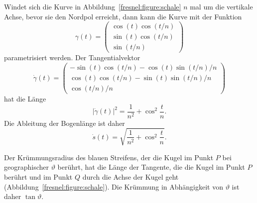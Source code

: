 Windet sich die Kurve in Abbildung~\ref{fresnel:figure:schale} $n$
mal um die vertikale Achse, bevor sie den Nordpol erreicht, dann kann
die Kurve mit der Funktion
\[
\gamma(t)
=
\begin{pmatrix}
\cos(t) \cos(t/n) \\
\sin(t) \cos(t/n) \\
\sin(t/n)
\end{pmatrix}
\]
parametrisiert werden.
Der Tangentialvektor
\[
\dot{\gamma}(t)
=
\begin{pmatrix}
-\sin(t)\cos(t/n) - \cos(t)\sin(t/n)/n \\
\cos(t)\cos(t/n) - \sin(t)\sin(t/n)/n \\
\cos(t/n)/n
\end{pmatrix}
\]
hat die Länge
\[
| \dot{\gamma}(t) |^2
=
\frac{1}{n^2}
+
\cos^2\frac{t}{n}.
\]
Die Ableitung der Bogenlänge ist daher
\[
\dot{s}(t)
=
\sqrt{
\frac{1}{n^2}
+
\cos^2\frac{t}{n}
}.
\]


Der Krümmungsradius des blauen Streifens, der die Kugel im Punkt $P$ bei 
geographischer $\vartheta$ berührt, hat die Länge der Tangente, die
die Kugel im Punkt $P$ berührt und im Punkt $Q$ durch die Achse der
Kugel geht (Abbildung~\ref{fresnel:figure:schale}).
Die Krümmung in Abhängigkeit von $\vartheta$ ist daher $\tan\vartheta$.




